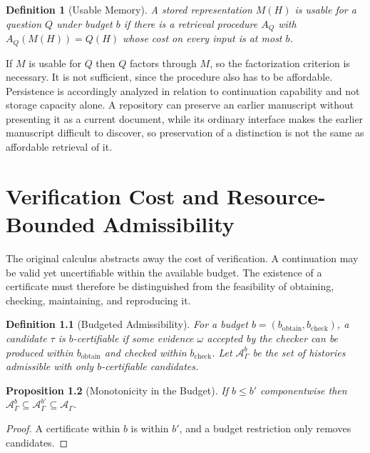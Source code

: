 \documentclass[12pt,oneside,openany]{book}
\theoremstyle{spherepop}
\newtheorem{definition}{Definition}[chapter]
\newtheorem{proposition}[definition]{Proposition}
\theoremstyle{remarkstyle}
\begin{document}
\begin{definition}[Usable Memory]
A stored representation $M(H)$ is \emph{usable for a question} $Q$ under budget $b$ if there is a retrieval procedure $A_Q$ with $A_Q(M(H))=Q(H)$ whose cost on every input is at most $b$.
\end{definition}

If $M$ is usable for $Q$ then $Q$ factors through $M$, so the factorization criterion is necessary. It is not sufficient, since the procedure also has to be affordable. Persistence is accordingly analyzed in relation to continuation capability and not storage capacity alone. A repository can preserve an earlier manuscript without presenting it as a current document, while its ordinary interface makes the earlier manuscript difficult to discover, so preservation of a distinction is not the same as affordable retrieval of it.

\chapter{Verification Cost and Resource-Bounded Admissibility}
\label{ch:cost}

The original calculus abstracts away the cost of verification. A continuation may be valid yet uncertifiable within the available budget. The existence of a certificate must therefore be distinguished from the feasibility of obtaining, checking, maintaining, and reproducing it.

\begin{definition}[Budgeted Admissibility]
For a budget $b=(b_{\mathrm{obtain}},b_{\mathrm{check}})$, a candidate $\tau$ is \emph{$b$-certifiable} if some evidence $\omega$ accepted by the checker can be produced within $b_{\mathrm{obtain}}$ and checked within $b_{\mathrm{check}}$. Let $\mathcal A_\Gamma^b$ be the set of histories admissible with only $b$-certifiable candidates.
\end{definition}

\begin{proposition}[Monotonicity in the Budget]
If $b\le b'$ componentwise then $\mathcal A^b_\Gamma\subseteq\mathcal A^{b'}_\Gamma\subseteq\mathcal A_\Gamma$.
\end{proposition}

\begin{proof}
A certificate within $b$ is within $b'$, and a budget restriction only removes candidates.
\end{proof}
\end{document}
